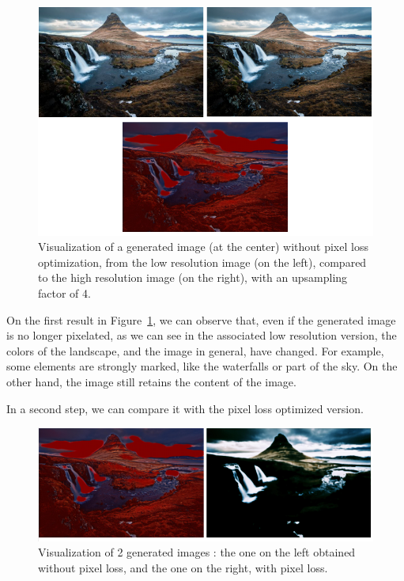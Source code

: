 \documentclass{article}
\begin{document}
{{        \begin{figure}[ht]
            \centering
            \includegraphics[width=\textwidth]{images/scaling_factor-4_without_pixel_loss.png}
            \caption{Visualization of a generated image (at the center) without pixel loss optimization, from the low resolution image (on the left), compared to the high resolution image (on the right), with an upsampling factor of 4.}
            \label{fig:scaling_factor_4_without_pixel_loss}
        \end{figure}

        On the first result in Figure~\ref{fig:scaling_factor_4_without_pixel_loss}, we can observe that, even if the generated image is no longer pixelated, as we can see in the associated low resolution version, the colors of the landscape, and the image in general, have changed. For example, some elements are strongly marked, like the waterfalls or part of the sky. On the other hand, the image still retains the content of the image.

        \bigskip

        In a second step, we can compare it with the pixel loss optimized version.

        \begin{figure}[ht]
            \centering
            \includegraphics[height=0.2\textheight]{images/comparison_using_pixel_loss.png}
            \caption{Visualization of 2 generated images : the one on the left obtained without pixel loss, and the one on the right, with pixel loss.}
            \label{fig:comparison_using_pixel_loss}
        \end{figure}

}}
\end{document}
